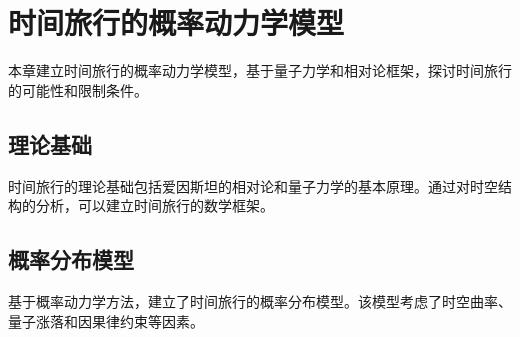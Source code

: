 \chapter{时间旅行的概率动力学模型}

本章建立时间旅行的概率动力学模型，基于量子力学和相对论框架，探讨时间旅行的可能性和限制条件。

\section{理论基础}

时间旅行的理论基础包括爱因斯坦的相对论和量子力学的基本原理。通过对时空结构的分析，可以建立时间旅行的数学框架。

\section{概率分布模型}

基于概率动力学方法，建立了时间旅行的概率分布模型。该模型考虑了时空曲率、量子涨落和因果律约束等因素。
